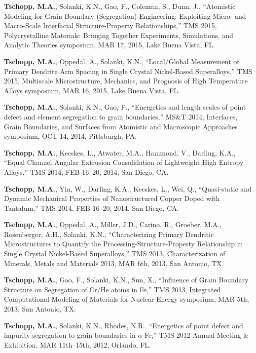 \begin{cvlist}
\item
\textbf{Tschopp, M.A.}, Solanki, K.N., Gao, F., Coleman, S., Dunn, J.,  ``Atomistic Modeling for Grain Boundary (Segregation) Engineering: Exploiting Micro- and Macro-Scale Interfacial Structure-Property Relationships,'' TMS 2015, Polycrystalline Materials: Bringing Together Experiments, Simulations, and Analytic Theories symposium, MAR 17, 2015, Lake Buena Vista, FL.

\item
\textbf{Tschopp, M.A.}, Oppedal, A., Solanki, K.N., ``Local/Global Measurement of Primary Dendrite Arm Spacing in Single Crystal Nickel-Based Superalloys,'' TMS 2015, Multiscale Microstructure, Mechanics, and Prognosis of High Temperature Alloys symposium, MAR 16, 2015, Lake Buena Vista, FL.

\item
\textbf{Tschopp, M.A.}, Solanki, K.N., Gao, F.,  ``Energetics and length scales of point defect and element segregation to grain boundaries,'' MS\&T 2014, Interfaces, Grain Boundaries, and Surfaces from Atomistic and Macroscopic Approaches symposium, OCT 14, 2014, Pittsburgh, PA.

\item
\textbf{Tschopp, M.A.}, Kecskes, L., Atwater, M.A., Hammond, V., Darling, K.A., ``Equal Channel Angular Extrusion Consolidation of Lightweight High Entropy Alloys,''  TMS 2014, FEB 16--20, 2014, San Diego, CA.

\item
\textbf{Tschopp, M.A.}, Yin, W., Darling, K.A., Kecskes, L., Wei, Q., ``Quasi-static and Dynamic Mechanical Properties of Nanostructured Copper Doped with Tantalum,''  TMS 2014, FEB 16--20, 2014, San Diego, CA.

\item
\textbf{Tschopp, M.A.}, Oppedal, A., Miller, J.D., Carino, R., Groeber, M.A., Rosenberger, A.H., Solanki, K.N., ``Characterizing Primary Dendritic Microstructures to Quantify the Processing-Structure-Property Relationship in Single Crystal Nickel-Based Superalloys,'' TMS 2013, Characterization of Minerals, Metals and Materials 2013, MAR 6th, 2013, San Antonio, TX.

\item
\textbf{Tschopp, M.A.}, Gao, F., Solanki, K.N., Sun, X., ``Influence of Grain Boundary Structure on Segregation of Cr/He atoms in Fe,'' TMS 2013, Integrated Computational Modeling of Materials for Nuclear Energy symposium, MAR 5th, 2013, San Antonio, TX.

\item
\textbf{Tschopp, M.A.}, Solanki, K.N., Rhodes, N.R., ``Energetics of point defect and impurity segregation to grain boundaries in $\alpha$-Fe,'' TMS 2012 Annual Meeting \& Exhibition, MAR 11th--15th, 2012, Orlando, FL.


\end{cvlist}
